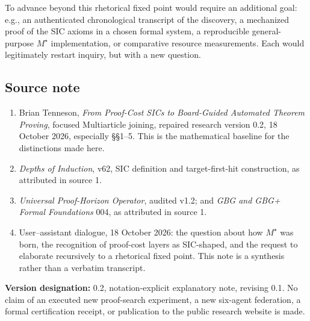 \documentclass[11pt,letterpaper]{article}
\newcommand{\Ms}{M^{\star}}
\begin{document}
To advance beyond this rhetorical fixed point would require an additional goal: e.g., an authenticated chronological transcript of the discovery, a mechanized proof of the SIC axioms in a chosen formal system, a reproducible general-purpose $\Ms$ implementation, or comparative resource measurements. Each would legitimately restart inquiry, but with a new question.

\subsection*{Source note}
\begin{enumerate}[leftmargin=1.7em,itemsep=2pt]
\item Brian Tenneson, \emph{From Proof-Cost SICs to Board-Guided Automated Theorem Proving}, focused Multiarticle joining, repaired research version 0.2, 18 October 2026, especially \S\S 1--5. This is the mathematical baseline for the distinctions made here.
\item \emph{Depths of Induction}, v62, SIC definition and target-first-hit construction, as attributed in source 1.
\item \emph{Universal Proof-Horizon Operator}, audited v1.2; and \emph{GBG and GBG+ Formal Foundations} 004, as attributed in source 1.
\item User--assistant dialogue, 18 October 2026: the question about how $M^{\star}$ was born, the recognition of proof-cost layers as SIC-shaped, and the request to elaborate recursively to a rhetorical fixed point. This note is a synthesis rather than a verbatim transcript.
\end{enumerate}
\vspace{4pt}
{\small\color{muted}\textbf{Version designation:} 0.2, notation-explicit explanatory note, revising 0.1. No claim of an executed new proof-search experiment, a new six-agent federation, a formal certification receipt, or publication to the public research website is made.}
\end{document}
